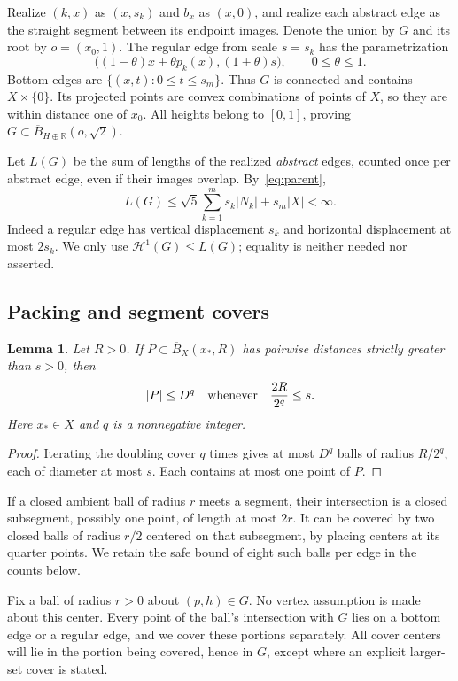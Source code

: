 \documentclass[11pt,a4paper]{article}
\newtheorem{lemma}[theorem]{Lemma}
\theoremstyle{definition}
\theoremstyle{remark}
\numberwithin{equation}{section}
\newcommand{\R}{\mathbb R}
\newcommand{\HH}{\mathcal H}
\newcommand{\cB}{\overline B}
\begin{document}
Realize $(k,x)$ as $(x,s_k)$ and $b_x$ as $(x,0)$, and realize each abstract edge as the straight segment between its endpoint images. Denote the union by $G$ and its root by $o=(x_0,1)$. The regular edge from scale $s=s_k$ has the parametrization
\begin{equation}\label{eq:edgeparam}
 \big((1-\theta)x+\theta p_k(x),(1+\theta)s\big),\qquad 0\le\theta\le1.
\end{equation}
Bottom edges are $\{(x,t):0\le t\le s_m\}$. Thus $G$ is connected and contains $X\times\{0\}$. Its projected points are convex combinations of points of $X$, so they are within distance one of $x_0$. All heights belong to $[0,1]$, proving $G\subset\cB_{H\oplus\R}(o,\sqrt2)$.

Let $L(G)$ be the sum of lengths of the realized \emph{abstract} edges, counted once per abstract edge, even if their images overlap. By~\eqref{eq:parent},
\begin{equation}\label{eq:length}
 L(G)\le \sqrt5\sum_{k=1}^{m}s_k|N_k|+s_m|X|<\infty.
\end{equation}
Indeed a regular edge has vertical displacement $s_k$ and horizontal displacement at most $2s_k$. We only use $\HH^1(G)\le L(G)$; equality is neither needed nor asserted.

\subsection{Packing and segment covers}
\begin{lemma}\label{lem:packing}
Let $R>0$. If $P\subset\cB_X(x_*,R)$ has pairwise distances strictly greater than $s>0$, then
\[
 |P|\le D^q\quad\hbox{whenever}\quad \frac{2R}{2^q}\le s.
\]
Here $x_*\in X$ and $q$ is a nonnegative integer.
\end{lemma}
\begin{proof}
Iterating the doubling cover $q$ times gives at most $D^q$ balls of radius $R/2^q$, each of diameter at most $s$. Each contains at most one point of $P$.
\end{proof}
If a closed ambient ball of radius $r$ meets a segment, their intersection is a closed subsegment, possibly one point, of length at most $2r$. It can be covered by two closed balls of radius $r/2$ centered on that subsegment, by placing centers at its quarter points. We retain the safe bound of eight such balls per edge in the counts below.

Fix a ball of radius $r>0$ about $(p,h)\in G$. No vertex assumption is made about this center. Every point of the ball's intersection with $G$ lies on a bottom edge or a regular edge, and we cover these portions separately. All cover centers will lie in the portion being covered, hence in $G$, except where an explicit larger-set cover is stated.
\end{document}
